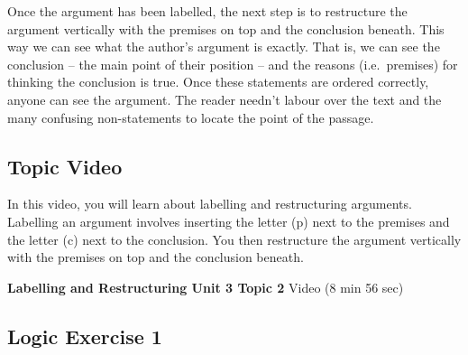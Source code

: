 \documentclass[
]{book}
\begin{document}
Once the argument has been labelled, the next step is to restructure the argument vertically with the premises on top and the conclusion beneath. This way we can see what the author's argument is exactly. That is, we can see the conclusion -- the main point of their position -- and the reasons (i.e.~premises) for thinking the conclusion is true. Once these statements are ordered correctly, anyone can see the argument. The reader needn't labour over the text and the many confusing non-statements to locate the point of the passage.

\hypertarget{topic-video-9}{%
\subsection*{Topic Video}\label{topic-video-9}}

In this video, you will learn about labelling and restructuring arguments. Labelling an argument involves inserting the letter (p) next to the premises and the letter (c) next to the conclusion. You then restructure the argument vertically with the premises on top and the conclusion beneath.

\textbf{Labelling and Restructuring Unit 3 Topic 2} Video (8 min 56 sec)

\hypertarget{logic-exercise-1-1}{%
\subsection*{Logic Exercise 1}\label{logic-exercise-1-1}}
\end{document}
